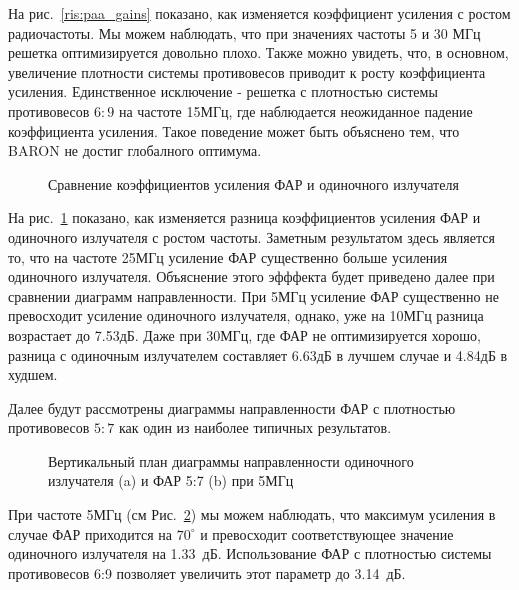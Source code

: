 На рис.~\ref{ris:paa_gains} показано, как изменяется коэффициент усиления с ростом радиочастоты. Мы можем наблюдать, что при значениях частоты 5 и 30 МГц решетка оптимизируется довольно плохо. Также можно увидеть, что, в основном, увеличение плотности системы противовесов приводит к росту коэффициента усиления. Единственное исключение - решетка с плотностью системы противовесов $6:9$ на частоте 15МГц, где наблюдается неожиданное падение коэффициента усиления. Такое поведение может быть объяснено тем, что BARON не достиг глобалного оптимума.

\begin{figure}
\caption{Сравнение коэффициентов усиления ФАР и одиночного излучателя}
\label{ris:all_gains}
\end{figure}

На рис.~\ref{ris:all_gains} показано, как изменяется разница коэффициентов усиления ФАР и одиночного излучателя с ростом частоты. Заметным результатом здесь является то, что на частоте 25МГц усиление ФАР существенно больше усиления одиночного излучателя. Объяснение этого эфффекта будет приведено далее при сравнении диаграмм направленности. При 5МГц усиление ФАР существенно не превосходит усиление одиночного излучателя, однако, уже на 10МГц разница возрастает до 7.53дБ. Даже при 30МГц, где ФАР не оптимизируется хорошо, разница с одиночным излучателем составляет 6.63дБ в лучшем случае и 4.84дБ в худшем.

Далее будут рассмотрены диаграммы направленности ФАР с плотностью противовесов $5:7$ как один из наиболее типичных результатов.

\begin{figure}
\begin{minipage}[h]{0.49\linewidth}
\end{minipage}
\hfill
\begin{minipage}[h]{0.49\linewidth}
\end{minipage}
\caption{Вертикальный план диаграммы направленности одиночного излучателя (a) и ФАР 5:7 (b) при 5МГц}
\label{ris:5MHz}
\end{figure}

При частоте 5МГц (см Рис.~\ref{ris:5MHz}) мы можем наблюдать, что максимум усиления в случае ФАР приходится на $70^{\circ}$ и превосходит соответствующее значение одиночного излучателя на 1.33~дБ. Использование ФАР с плотностью системы противовесов 6:9 позволяет увеличить этот параметр до 3.14~дБ.

